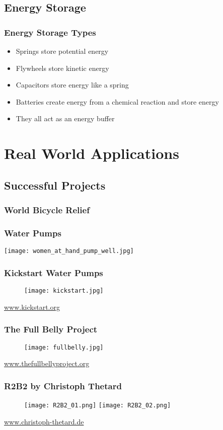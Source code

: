 \documentclass[]{beamer}
\begin{document}
\subsection{Energy Storage}
\frame
{
    \frametitle{Energy Storage Types}
    \begin{itemize}[<+->]
        \item Springs store potential energy 
        \item Flywheels store kinetic energy 
        \item Capacitors store energy like a spring 
        \item Batteries create energy from a chemical reaction and store energy
        \item They all act as an energy buffer
    \end{itemize}
}
\section{Real World Applications}
\subsection{Successful Projects}
\frame
{
    \frametitle{World Bicycle Relief}
}
\note{}
\frame
{
    \frametitle{Water Pumps}
    \begin{center}
        \texttt{[image: women\_at\_hand\_pump\_well.jpg]}
    \end{center}
}
\frame
{
    \frametitle{Kickstart Water Pumps}
    \begin{center}
        \begin{figure}[]
            \texttt{[image: kickstart.jpg]}
        \end{figure}
        \url{www.kickstart.org}
    \end{center}
}
\frame
{
    \frametitle{The Full Belly Project}
    \begin{center}
        \begin{figure}[]
            \texttt{[image: fullbelly.jpg]}
        \end{figure}
        \url{www.thefullbellyproject.org}
    \end{center}
}
\frame
{
    \frametitle{R2B2 by Christoph Thetard}
    \begin{center}
        \begin{figure}[]
            \texttt{[image: R2B2\_01.png]}
            \texttt{[image: R2B2\_02.png]}
        \end{figure}
        \url{www.christoph-thetard.de}
    \end{center}
}
\end{document}
